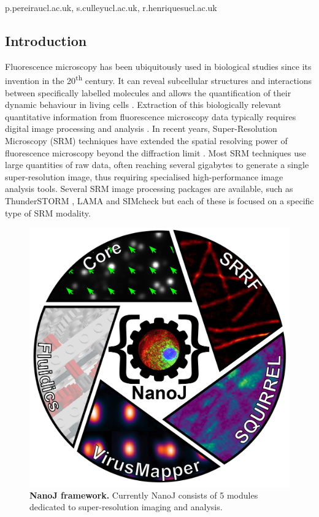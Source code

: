 \begin{corrauthor}
    p.pereira\at ucl.ac.uk, s.culley\at ucl.ac.uk, r.henriques\at ucl.ac.uk
\end{corrauthor}


\subsection*{Introduction}
Fluorescence microscopy has been ubiquitously used in biological studies since its invention in the 20\textsuperscript{th} century. It can reveal subcellular structures and interactions between specifically labelled molecules and allows the quantification of their dynamic behaviour in living cells \cite{rino2009frontiers}. Extraction of this biologically relevant quantitative information from fluorescence microscopy data typically requires digital image processing and analysis \cite{wheeler2017standard}. In recent years, Super-Resolution Microscopy (SRM) techniques have extended the spatial resolving power of fluorescence microscopy beyond the diffraction limit \cite{betzig2006imaging,rust2006sub,hell1994breaking}. Most SRM techniques use large quantities of raw data, often reaching several gigabytes to generate a single super-resolution image, thus requiring specialised high-performance image analysis tools. Several SRM image processing packages are available, such as ThunderSTORM \cite{ovesny2014thunderstorm}, LAMA \cite{malkusch2016extracting} and SIMcheck \cite{schermelleh2015simcheck} but each of these is focused on a specific type of SRM modality.
  
 \begin{figure}[!t]
    \centering
    \includegraphics[width=0.8\linewidth]{Figures/FigureMain_v4.png}
    \caption{\textbf{NanoJ framework.} Currently NanoJ consists of 5 modules dedicated to super-resolution imaging and analysis.}
    \label{fig:GeneralDiagram}
 \end{figure}
 
